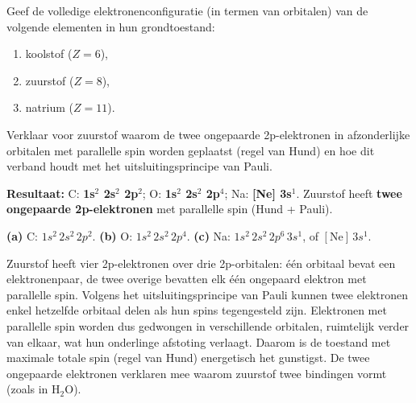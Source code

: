\begin{oefening}
Geef de volledige elektronenconfiguratie (in termen van orbitalen) van de volgende elementen in hun grondtoestand:

\begin{enumerate}
\item[(a)]
  koolstof (\(Z=6\)),
\item[(b)]
  zuurstof (\(Z=8\)),
\item[(c)]
  natrium (\(Z=11\)).
\end{enumerate}

Verklaar voor zuurstof waarom de twee ongepaarde 2p-elektronen in afzonderlijke orbitalen met parallelle spin worden geplaatst (regel van Hund) en hoe dit verband houdt met het uitsluitingsprincipe van Pauli.
\end{oefening}
\begin{oplossing}
\textbf{Resultaat:} C: \textbf{1s\ensuremath{^{2}} 2s\ensuremath{^{2}} 2p\ensuremath{^{2}}}; O: \textbf{1s\ensuremath{^{2}} 2s\ensuremath{^{2}} 2p\ensuremath{^{4}}}; Na: \textbf{{[}Ne{]} 3s\ensuremath{^{1}}}. Zuurstof heeft \textbf{twee ongepaarde 2p-elektronen} met parallelle spin (Hund + Pauli).

\textbf{(a)} C: \(1s^2\,2s^2\,2p^2\). \textbf{(b)} O: \(1s^2\,2s^2\,2p^4\). \textbf{(c)} Na: \(1s^2\,2s^2\,2p^6\,3s^1\), of \([\mathrm{Ne}]\,3s^1\).

Zuurstof heeft vier 2p-elektronen over drie 2p-orbitalen: één orbitaal bevat een elektronenpaar, de twee overige bevatten elk één ongepaard elektron met parallelle spin. Volgens het uitsluitingsprincipe van Pauli kunnen twee elektronen enkel hetzelfde orbitaal delen als hun spins tegengesteld zijn. Elektronen met parallelle spin worden dus gedwongen in verschillende orbitalen, ruimtelijk verder van elkaar, wat hun onderlinge afstoting verlaagt. Daarom is de toestand met maximale totale spin (regel van Hund) energetisch het gunstigst. De twee ongepaarde elektronen verklaren mee waarom zuurstof twee bindingen vormt (zoals in \(\mathrm{H_2O}\)).
\end{oplossing}

